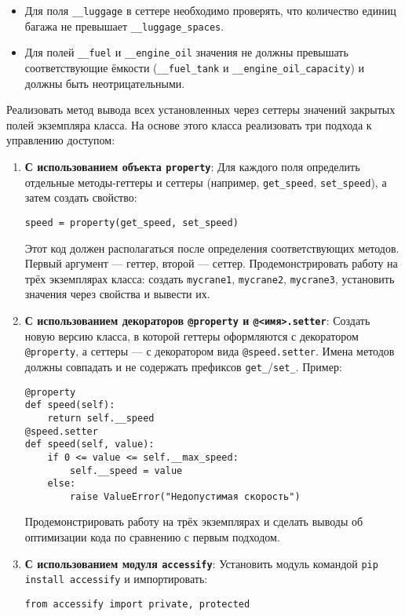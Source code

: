 \begin{enumerate}
\begin{itemize}
    \item Для поля \texttt{\_\_luggage} в сеттере необходимо проверять, что количество единиц багажа не превышает \texttt{\_\_luggage\_spaces}.
    \item Для полей \texttt{\_\_fuel} и \texttt{\_\_engine\_oil} значения не должны превышать соответствующие ёмкости (\texttt{\_\_fuel\_tank} и \texttt{\_\_engine\_oil\_capacity}) и должны быть неотрицательными.
\end{itemize}
Реализовать метод вывода всех установленных через сеттеры значений закрытых полей экземпляра класса.
На основе этого класса реализовать три подхода к управлению доступом:
\begin{enumerate}
    \item \textbf{С использованием объекта \texttt{property}}:  
    Для каждого поля определить отдельные методы-геттеры и сеттеры (например, \texttt{get\_speed}, \texttt{set\_speed}), а затем создать свойство:  
    \begin{verbatim}
speed = property(get_speed, set_speed)
    \end{verbatim}  
    Этот код должен располагаться после определения соответствующих методов. Первый аргумент — геттер, второй — сеттер.  
    Продемонстрировать работу на трёх экземплярах класса: создать \texttt{mycrane1}, \texttt{mycrane2}, \texttt{mycrane3}, установить значения через свойства и вывести их.
    \item \textbf{С использованием декораторов \texttt{@property} и \texttt{@<имя>.setter}}:  
    Создать новую версию класса, в которой геттеры оформляются с декоратором \texttt{@property}, а сеттеры — с декоратором вида \texttt{@speed.setter}. Имена методов должны совпадать и не содержать префиксов \texttt{get\_}/\texttt{set\_}.  
    Пример:  
    \begin{verbatim}
@property
def speed(self):
    return self.__speed
@speed.setter
def speed(self, value):
    if 0 <= value <= self.__max_speed:
        self.__speed = value
    else:
        raise ValueError("Недопустимая скорость")
    \end{verbatim}  
    Продемонстрировать работу на трёх экземплярах и сделать выводы об оптимизации кода по сравнению с первым подходом.
    \item \textbf{С использованием модуля \texttt{accessify}}:  
    Установить модуль командой \texttt{pip install accessify} и импортировать:  
    \begin{verbatim}
from accessify import private, protected
    \end{verbatim}  

\end{enumerate}
\end{enumerate}
